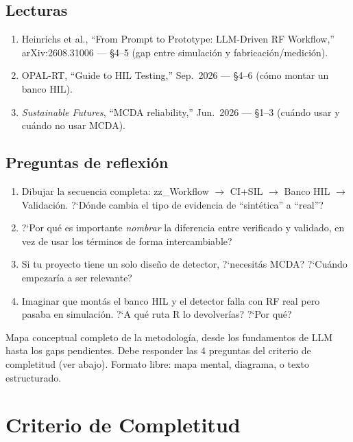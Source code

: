 \documentclass[11pt,a4paper]{article}
\begin{document}
\subsection{Lecturas}
\begin{enumerate}[label=\textbf{L\arabic*.}]
  \item Heinrichs et al., ``From Prompt to Prototype: LLM-Driven RF Workflow,'' arXiv:2608.31006 --- \S4--5 (gap entre simulaci\'on y fabricaci\'on/medici\'on).
  \item OPAL-RT, ``Guide to HIL Testing,'' Sep.\ 2026 --- \S4--6 (c\'omo montar un banco HIL).
  \item \textit{Sustainable Futures}, ``MCDA reliability,'' Jun.\ 2026 --- \S1--3 (cu\'ando usar y cu\'ando no usar MCDA).
\end{enumerate}

\subsection{Preguntas de reflexi\'on}
\begin{enumerate}[label=\textbf{R\arabic*.}]
  \item Dibujar la secuencia completa: zz\_Workflow $\to$ CI+SIL $\to$ Banco HIL $\to$ Validaci\'on. ?`D\'onde cambia el tipo de evidencia de ``sint\'etica'' a ``real''?
  \item ?`Por qu\'e es importante \textit{nombrar} la diferencia entre verificado y validado, en vez de usar los t\'erminos de forma intercambiable?
  \item Si tu proyecto tiene un solo dise\~no de detector, ?`necesit\'as MCDA? ?`Cu\'ando empezar\'ia a ser relevante?
  \item Imaginar que mont\'as el banco HIL y el detector falla con RF real pero pasaba en simulaci\'on. ?`A qu\'e ruta R lo devolver\'ias? ?`Por qu\'e?
\end{enumerate}

\begin{deliverbox}
Mapa conceptual completo de la metodolog\'ia, desde los fundamentos de LLM hasta los gaps pendientes. Debe responder las 4 preguntas del criterio de completitud (ver abajo). Formato libre: mapa mental, diagrama, o texto estructurado.
\end{deliverbox}

\section{Criterio de Completitud}
\end{document}
